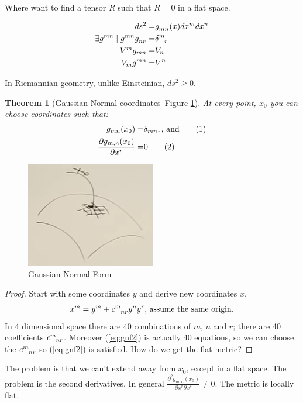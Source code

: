 \documentclass[]{article}
\newcommand\numberthis{\addtocounter{equation}{1}\tag{\theequation}}
\newtheorem{thm}{Theorem}
\begin{document}
Where want to find a tensor $R$ such that $R=0$ in a flat space.

\begin{align*}
	ds^2 =& g\indices{_{mn}}(x) dx^m dx^n\\
	\exists  g\indices{^{mn}} \mid  g\indices{^{mn}} g\indices{_{nr}} =& \delta\indices{^m_r}\\
	V^m g_{mn} =& V_n\\
	V_m g^{mn} =& V^n
\end{align*}
 
 In Riemannian geometry, unlike Einsteinian, $ds^2 \ge 0$.
 
 \begin{thm}[Gaussian Normal coordinates--Figure \ref{fig:gr-4-gaussian-normal}]
 	At every point, $x_0$ you can choose coordinates such that:
 	\begin{align*}
 	g_{mn}(x_0)=&\delta_{mn}, \text{, and} \numberthis \label{eq:gnf1}\\
 	\frac{\partial g_{m,n}(x_0)}{\partial x^r}=&0 \numberthis \label{eq:gnf2}
 	\end{align*}
 \end{thm}

\begin{figure}[H]
	\begin{center}
		\caption{Gaussian Normal Form}\label{fig:gr-4-gaussian-normal}
		\includegraphics{gr-4-gaussian-normal}
	\end{center}
\end{figure}

\begin{proof}
	Start with some coordinates $y$ and derive new coordinates $x$.
	\begin{align*}
		x^m = y^m + c\indices{^m_{nr}} y^n y^r \text{, assume the same origin.}
	\end{align*}
	In 4 dimensional space there are 40 combinations of $m$, $n$ and $r$; there are 40 coefficients $c\indices{^m_{nr}}$. Moreover (\ref{eq:gnf2}) is actually 40 equations, so we can choose the $c\indices{^m_{nr}}$ so (\ref{eq:gnf2})  is satisfied.
	How do we get the flat metric?
\end{proof}
The problem is that we can't extend away from $x_0$, except in a flat space. The problem is the second derivatives. In general $\frac{\partial^2 g_{m,n}(x_0)}{\partial x^r \partial x^s}\ne0$. The metric is locally flat.
\end{document}

